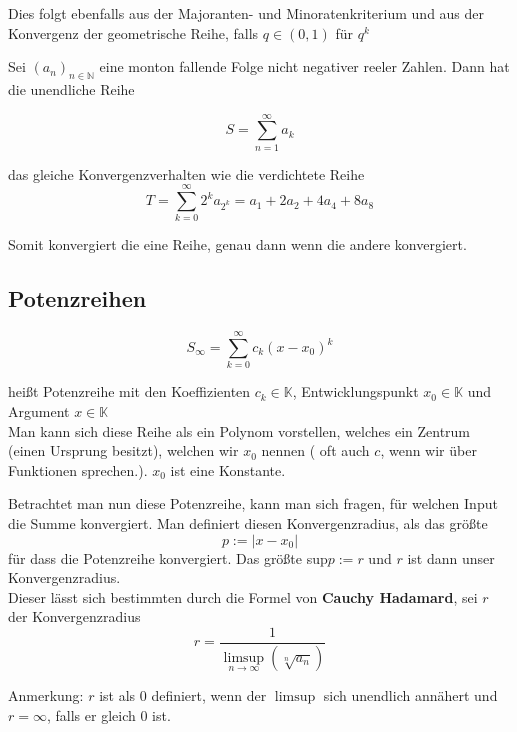 \documentclass[headsepline,12pt,a4paper]{scrartcl}
\makeatletter
\def\myItem{%
   \@ifnextchar[ \@myItem{\@noitemargtrue\@myItem[\@itemlabel]}}
\def\@myItem[#1]{\item[#1]\mbox{}\\}
\def\myItemc{%
   \@ifnextchar[ \@myItem{\@noitemargtrue\@myItem[\@itemlabel]}}
\makeatother
\begin{document}
Dies folgt ebenfalls aus der Majoranten- und Minoratenkriterium und aus der Konvergenz der geometrische Reihe, falls $q \in (0,1)$ für $q^k$ \\

\begin{center}
\myItemc[Cauchy Verdichtungssatz]
\end{center}

Sei $(a_n)_{n\in \mathbb{N}}$ eine monton fallende Folge nicht negativer reeler Zahlen. Dann hat die unendliche Reihe

$$ S = \sum\limits_{n=1}^{\infty} a_k$$

das gleiche Konvergenzverhalten wie die verdichtete Reihe 
$$ T = \sum\limits_{k=0}^{\infty} 2^k a_{2^k}=a_1+2 a_2 + 4 a_4 + 8 a_8 $$ 

Somit konvergiert die eine Reihe, genau dann wenn die andere konvergiert. \\

\subsection*{Potenzreihen}

\myItem[Potenzreihe]

$$ S_{\infty} = \sum\limits_{k=0}^{\infty} c_k(x-x_0)^k$$

heißt Potenzreihe mit den Koeffizienten $c_k \in \mathbb{K}$, Entwicklungspunkt $x_0 \in \mathbb{K}$ und  Argument $x \in \mathbb{K} $ \\ 

Man kann sich diese Reihe als ein Polynom vorstellen, welches ein Zentrum (einen Ursprung besitzt), welchen wir $x_0$ nennen ( oft auch $c$, wenn wir über Funktionen sprechen.). $x_0$ ist eine Konstante. \\

\myItem[Konvergenzradius]
 
Betrachtet man nun diese Potenzreihe, kann man sich fragen, für welchen Input die Summe konvergiert. Man definiert diesen Konvergenzradius, als das größte 
$$ p:= |x-x_0| $$ für dass die Potenzreihe konvergiert. Das größte sup$ p:= r$ und $r$ ist dann unser Konvergenzradius.\\

Dieser lässt sich bestimmten durch die Formel von \textbf{Cauchy Hadamard}, sei $r$ der Konvergenzradius
$$ r = \frac{1}{\limsup\limits_{n \rightarrow \infty} (\sqrt[n]{a_n})} $$

Anmerkung: $r$ ist als 0 definiert, wenn der $\limsup$ sich unendlich annähert und $r=\infty$, falls er gleich 0 ist. \\
\end{document}
